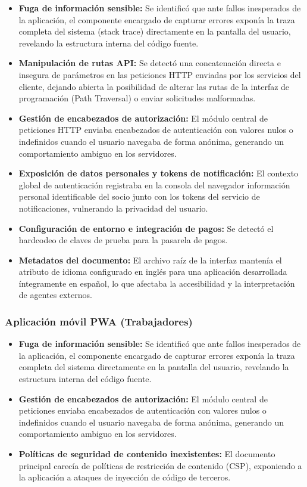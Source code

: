 \begin{itemize}
    \item \textbf{Fuga de información sensible:} Se identificó que ante fallos inesperados de la aplicación, el componente encargado de capturar errores exponía la traza completa del sistema (stack trace) directamente en la pantalla del usuario, revelando la estructura interna del código fuente.
    \item \textbf{Manipulación de rutas API:} Se detectó una concatenación directa e insegura de parámetros en las peticiones HTTP enviadas por los servicios del cliente, dejando abierta la posibilidad de alterar las rutas de la interfaz de programación (Path Traversal) o enviar solicitudes malformadas.
    \item \textbf{Gestión de encabezados de autorización:} El módulo central de peticiones HTTP enviaba encabezados de autenticación con valores nulos o indefinidos cuando el usuario navegaba de forma anónima, generando un comportamiento ambiguo en los servidores.
    \item \textbf{Exposición de datos personales y tokens de notificación:} El contexto global de autenticación registraba en la consola del navegador información personal identificable del socio junto con los tokens del servicio de notificaciones, vulnerando la privacidad del usuario.
    \item \textbf{Configuración de entorno e integración de pagos:} Se detectó el hardcodeo de claves de prueba para la pasarela de pagos.
    \item \textbf{Metadatos del documento:} El archivo raíz de la interfaz mantenía el atributo de idioma configurado en inglés para una aplicación desarrollada íntegramente en español, lo que afectaba la accesibilidad y la interpretación de agentes externos.
\end{itemize}

\subsubsection{Aplicación móvil PWA (Trabajadores)}

\begin{itemize}
    \item \textbf{Fuga de información sensible:} Se identificó que ante fallos inesperados de la aplicación, el componente encargado de capturar errores exponía la traza completa del sistema directamente en la pantalla del usuario, revelando la estructura interna del código fuente.
    \item \textbf{Gestión de encabezados de autorización:} El módulo central de peticiones enviaba encabezados de autenticación con valores nulos o indefinidos cuando el usuario navegaba de forma anónima, generando un comportamiento ambiguo en los servidores.
    \item \textbf{Políticas de seguridad de contenido inexistentes:} El documento principal carecía de políticas de restricción de contenido (CSP), exponiendo a la aplicación a ataques de inyección de código de terceros.
\end{itemize}

